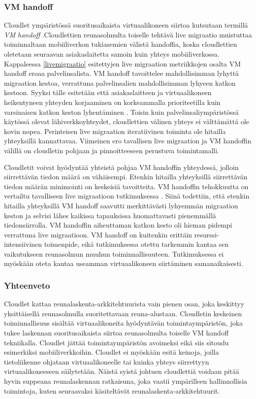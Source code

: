 \subsubsection*{VM handoff} \label{vmhandoff}

Cloudlet ympäristössä suoritusaikaista virtuaalikoneen siirtoa kutsutaan termillä \textit{VM handoff} \cite{ha2015adaptive}.Cloudlettien reunasolmulta toiselle tehtävä live migraatio muistuttaa toiminnaltaan mobiiliverkon tukiasemien välistä handoffia, koska cloudlettien oletetaan seuraavan asiakaslaitetta samoin kuin yhteys mobiiliverkossa.
Kappaleessa \ref{livemigraatio} esitettyjen live migraation metriikkojen osalta VM handoff eroaa palvelinsalista. VM handoff tavoittelee mahdollisimman lyhyttä migraation kestoa, verrattuna palvelinsalien mahdollisimman lyhyeen katkon kestoon.
Syyksi tälle esitetään että asiakaslaitteen ja virtuaalikoneen heikentyneen yhteyden korjaaminen on korkeammalla prioriteetilla kuin varsinaisen katkon keston lyhentäminen \cite{ha2015adaptive}.
Toisin kuin palvelinsaliympäristössä käytössä olevat lähiverkkoyhteydet, cloudlettien välinen yhteys ei välttämättä ole kovin nopea. 
Perinteisen live migraation iteratiivinen toiminta ole hitailla yhteyksillä kannattavaa. 
Viimeinen ero tavallisen live migraation ja VM handoffin välillä on cloudletin pohjaan ja pinnoitteeseen perustuva toimintamalli.

Cloudletit voivat hyödyntää yhteistä pohjaa VM handoffin yhteydessä, jolloin siirrettävän tiedon määrä on vähäisempi. 
Etenkin hitailla yhteyksillä siirrettävän tiedon määrän minimointi on keskeisiä tavoitteita. 
VM handoffin tehokkuutta on vertailtu tavalliseen live migraatioon tutkimuksessa \cite{ha2017you}. Siinä todettiin, että etenkin hitailla yhteyksillä VM handoff saavutti merkittävästi lyhyemmän migraation keston ja selvisi lähes kaikissa tapauksissa huomattavasti pienemmällä tiedonsiirrolla. VM handoffin aiheuttaman katkon kesto oli hieman pidempi verrattuna live migraatioon. 
VM handoff on kuitenkin erittäin resurssi-intensiivinen toimenpide, eikä tutkimuksessa otettu tarkemmin kantaa sen vaikutukseen reunasolmun muuhun toiminnallisuuteen. 
Tutkimuksessa ei myöskään oteta kantaa useamman virtuaalikoneen siirtäminen samanaikaisesti. 
\subsubsection*{Yhteenveto}
Cloudlet kattaa reunalaskenta-arkkitehtuurista vain pienen osan, joka keskittyy yksittäisellä reunasolmulla suoritettavaan reuna-alustaan. Cloudletin keskeinen toiminnallisuus sisältää virtuaalikoneita hyödyntävän toimintaympäristön, joka tukee laskennan suoritusaikaista siirtoa reunasolmulta toiselle VM handoff tekniikalla. 
Cloudlet jättää toimintaympäristön avoimeksi eikä siis sitoudu esimerkiksi mobiiliverkkoihin.
Cloudlet ei myöskään esitä keinoja, joilla tietoliikenne ohjataan virtuaalikoneelle tai kuinka yhteys siirrettyyn virtuaalikoneeseen säilytetään. 
Näistä syistä johtuen cloudlettiä voidaan pitää hyvin suppeana reunalaskennan ratkaisuna, joka vaatii ympärilleen hallinnollisia toimintoja, kuten seuraavaksi käsiteltävät reunalaskenta-arkkitehtuurit.
